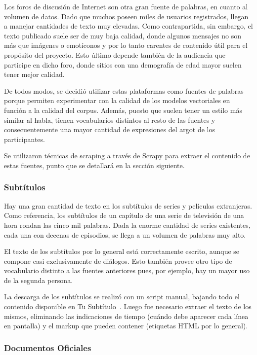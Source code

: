Los foros de discusión de Internet son otra gran fuente de palabras, en cuanto al volumen de
datos. Dado que muchos poseen miles de usuarios registrados, llegan a manejar cantidades de texto
muy elevadas. Como contrapartida, sin embargo, el texto publicado suele ser de muy baja calidad,
donde algunos mensajes no son más que imágenes o emotíconos y por lo tanto carentes de contenido
útil para el propósito del proyecto. Esto último depende también de la audiencia que participe en
dicho foro, donde sitios con una demografía de edad mayor suelen tener mejor calidad.

De todos modos, se decidió utilizar estas plataformas como fuentes de palabras porque permiten
experimentar con la calidad de los modelos vectoriales en función a la calidad del corpus. Además,
puesto que suelen tener un estilo más similar al habla, tienen vocabularios distintos al resto de
las fuentes y consecuentemente una mayor cantidad de expresiones del argot de los participantes.

Se utilizaron técnicas de scraping a través de Scrapy para extraer el contenido de estas fuentes,
punto que se detallará en la sección siguiente.


\subsubsection{Subtítulos}

Hay una gran cantidad de texto en los subtítulos de series y películas extranjeras. Como referencia,
los subtítulos de un capítulo de una serie de televisión de una hora rondan las cinco mil
palabras. Dada la enorme cantidad de series existentes, cada una con decenas de episodios, se llega
a un volumen de palabras muy alto.

El texto de los subtítulos por lo general está correctamente escrito, aunque se compone casi
exclusivamente de diálogos. Esto también provee otro tipo de vocabulario distinto a las fuentes
anteriores pues, por ejemplo, hay un mayor uso de la segunda persona.

La descarga de los subtítulos se realizó con un script manual, bajando todo el contenido disponible
en Tu Subtítulo~\cite{TuSubtitulo}. Luego fue necesario extraer el texto de los mismos, eliminando
las indicaciones de tiempo (cuándo debe aparecer cada línea en pantalla) y el markup que pueden
contener (etiquetas HTML por lo general).


\subsubsection{Documentos Oficiales}

